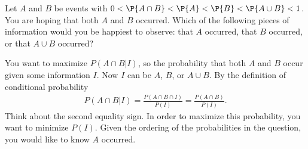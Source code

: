 

\setcounter{theorem}{10}

\begin{exercise}[BH.2.11]
Let $A$ and $B$ be events with $0 < \P{A \cap B} < \P{A} < \P{B} < \P{A \cup B} < 1$. You are hoping that both $A$ and $B$ occurred. Which of the following pieces of information would you be happiest to observe: that $A$ occurred, that $B$ occurred, or that $A \cup B$ occurred?
\begin{solution}
	You want to maximize $P(A\cap B|I)$, so the probability that both $A$ and $B$ occur given some information $I$. Now $I$ can be $A$, $B$, or $A\cup B$. By the definition of conditional probability
	\begin{align*}
		P(A\cap B|I) =\frac{P(A\cap B\cap I)}{P(I)} = \frac{P(A\cap B)}{P(I)}.
	\end{align*}
	Think about the second equality sign. In order to maximize this probability, you want to minimize $P(I)$. Given the ordering of the probabilities in the question, you would like to know $A$ occurred.	
\end{solution}
\end{exercise}


